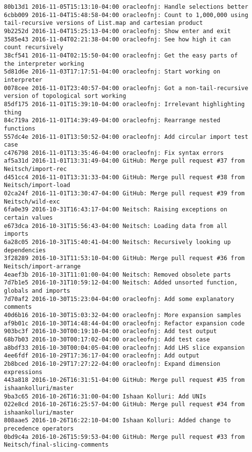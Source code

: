 \begin{lstlisting}
80b13d1 2016-11-05T15:13:10-04:00 oracleofnj: Handle selections better
6cbb009 2016-11-04T15:48:58-04:00 oracleofnj: Count to 1,000,000 using tail-recursive versions of List.map and cartesian product
9b2252d 2016-11-04T15:25:13-04:00 oracleofnj: Show enter and exit
3585e43 2016-11-04T02:21:38-04:00 oracleofnj: See how high it can count recursively
38cf541 2016-11-04T02:15:50-04:00 oracleofnj: Get the easy parts of the interpreter working
5d81d6e 2016-11-03T17:17:51-04:00 oracleofnj: Start working on interpreter
0078cee 2016-11-01T23:40:57-04:00 oracleofnj: Got a non-tail-recursive version of topological sort working
85df175 2016-11-01T15:39:10-04:00 oracleofnj: Irrelevant highlighting thing
84c719a 2016-11-01T14:39:49-04:00 oracleofnj: Rearrange nested functions
557dc4e 2016-11-01T13:50:52-04:00 oracleofnj: Add circular import test case
c476798 2016-11-01T13:35:46-04:00 oracleofnj: Fix syntax errors
af5a31d 2016-11-01T13:31:49-04:00 GitHub: Merge pull request #37 from Neitsch/import-rec
d451cc4 2016-11-01T13:31:33-04:00 GitHub: Merge pull request #38 from Neitsch/import-load
02ca24f 2016-11-01T13:30:47-04:00 GitHub: Merge pull request #39 from Neitsch/wild-exc
6fa0e39 2016-10-31T16:43:17-04:00 Neitsch: Raising exceptions on certain values
e673dca 2016-10-31T15:56:43-04:00 Neitsch: Loading data from all imports
6a28c05 2016-10-31T15:40:41-04:00 Neitsch: Recursively looking up dependencies
3f28289 2016-10-31T11:53:10-04:00 GitHub: Merge pull request #36 from Neitsch/import-arrange
4eaef3b 2016-10-31T11:01:00-04:00 Neitsch: Removed obsolete parts
7d7b1e5 2016-10-31T10:59:12-04:00 Neitsch: Added unsorted function, globals and imports
7d70af2 2016-10-30T15:23:04-04:00 oracleofnj: Add some explanatory comments
40d6b16 2016-10-30T15:03:32-04:00 oracleofnj: More expansion samples
af9b01c 2016-10-30T14:48:44-04:00 oracleofnj: Refactor expansion code
903bc3f 2016-10-30T00:19:10-04:00 oracleofnj: Add test output
68b7b03 2016-10-30T00:17:02-04:00 oracleofnj: Add test case
a8bdf33 2016-10-30T00:04:05-04:00 oracleofnj: Add LHS slice expansion
4ee6fdf 2016-10-29T17:36:17-04:00 oracleofnj: Add output
2b8bced 2016-10-29T17:27:22-04:00 oracleofnj: Expand dimension expressions
443a818 2016-10-26T16:31:51-04:00 GitHub: Merge pull request #35 from ishaankolluri/master
9ba3c65 2016-10-26T16:31:00-04:00 Ishaan Kolluri: Add UNIs
022e8cd 2016-10-26T16:25:57-04:00 GitHub: Merge pull request #34 from ishaankolluri/master
808aae5 2016-10-26T16:22:10-04:00 Ishaan Kolluri: Added change to precedence operators
0bd9c4a 2016-10-26T15:59:53-04:00 GitHub: Merge pull request #33 from Neitsch/final-slicing-comments

\end{lstlisting}
